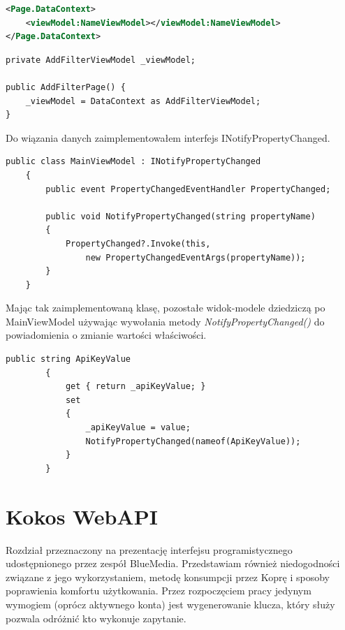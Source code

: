 \documentclass[a4paper,twoside,titlepage,openright]{book}
\begin{document}

\begin{lstlisting}[caption=Podpięcie widok-modelu do Widoku w pliku XAML, label=lst:test, language=xml]
<Page.DataContext>
	<viewModel:NameViewModel></viewModel:NameViewModel>
</Page.DataContext>
\end{lstlisting}


\begin{lstlisting}[caption=Podpięcie widok-modelu w pliku Code-Behind. W konstruktorze inicjalizuje obiekt podając widok-model\, z którym jest spięty., label=lst:test]
private AddFilterViewModel _viewModel;

public AddFilterPage() {
	_viewModel = DataContext as AddFilterViewModel;
}
\end{lstlisting}

Do wiązania danych zaimplementowałem interfejs INotifyPropertyChanged. 

\begin{lstlisting}[caption=Implementacja interfejsu INotifyPropertyChanged w jednej z klas, label=lst:test, language=xml]
public class MainViewModel : INotifyPropertyChanged
    {
        public event PropertyChangedEventHandler PropertyChanged;

        public void NotifyPropertyChanged(string propertyName)
        {
            PropertyChanged?.Invoke(this,
                new PropertyChangedEventArgs(propertyName));
        }
    }
\end{lstlisting}

Mając tak zaimplementowaną klasę, pozostałe widok-modele dziedziczą po MainViewModel używając wywołania metody \textit{NotifyPropertyChanged()} do powiadomienia o zmianie wartości właściwości.
\begin{lstlisting}[caption=Przykładowa właściwość wykorzystująca mechanizm NotifyPropertyChanged, label=lst:test, language=xml]
		public string ApiKeyValue
		{
			get { return _apiKeyValue; }
			set
			{
				_apiKeyValue = value;
				NotifyPropertyChanged(nameof(ApiKeyValue));
			}
		}
\end{lstlisting}

\section{Kokos WebAPI}

Rozdział przeznaczony na prezentację interfejsu programistycznego udostępnionego przez zespół BlueMedia. Przedstawiam również niedogodności związane z jego wykorzystaniem, metodę konsumpcji przez Koprę i sposoby poprawienia komfortu użytkowania. Przez rozpoczęciem pracy jedynym wymogiem (oprócz aktywnego konta) jest wygenerowanie klucza, który służy pozwala odróżnić kto wykonuje zapytanie.
\end{document}

